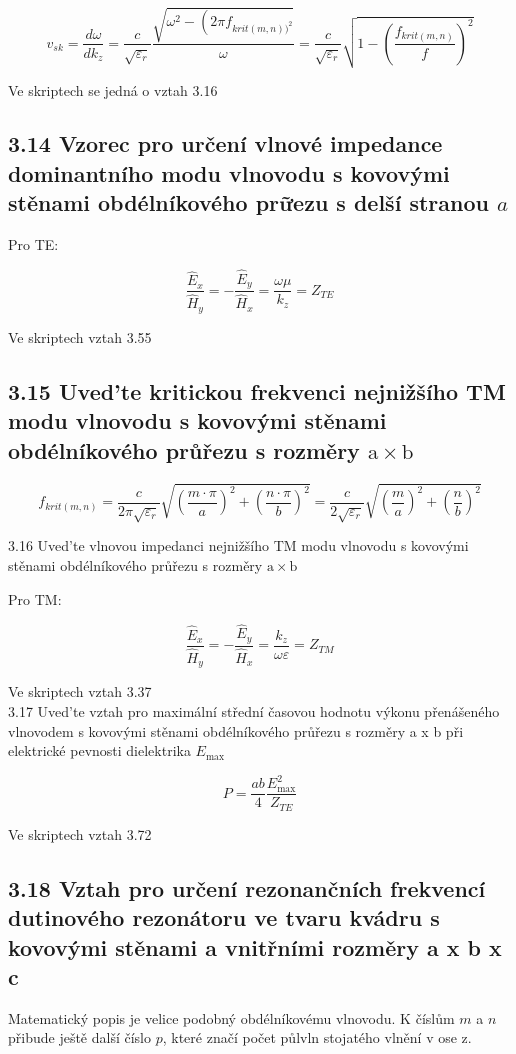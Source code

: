 \documentclass[10pt]{article}
\begin{document}
$$
v_{s k}=\frac{d \omega}{d k_{z}}=\frac{c}{\sqrt{\varepsilon_{r}}} \frac{\sqrt{\omega^{2}-\left(2 \pi f_{k r i t(m, n))^{2}}\right.}}{\omega}=\frac{c}{\sqrt{\varepsilon_{r}}} \sqrt{1-\left(\frac{f_{k r i t(m, n)}}{f}\right)^{2}}
$$

Ve skriptech se jedná o vztah 3.16

\subsection*{3.14 Vzorec pro určení vlnové impedance dominantního modu vlnovodu s kovovými stěnami obdélníkového prữezu s delší stranou $a$}
Pro TE:

$$
\frac{\hat{E}_{x}}{\hat{H}_{y}}=-\frac{\hat{E}_{y}}{\hat{H}_{x}}=\frac{\omega \mu}{k_{z}}=Z_{T E}
$$

Ve skriptech vztah 3.55

\subsection*{3.15 Uved'te kritickou frekvenci nejnižšího TM modu vlnovodu s kovovými stěnami obdélníkového průřezu s rozměry $\mathrm{a} \times \mathrm{b}$}
$$
f_{k r i t(m, n)}=\frac{c}{2 \pi \sqrt{\varepsilon_{r}}} \sqrt{\left(\frac{m \cdot \pi}{a}\right)^{2}+\left(\frac{n \cdot \pi}{b}\right)^{2}}=\frac{c}{2 \sqrt{\varepsilon_{r}}} \sqrt{\left(\frac{m}{a}\right)^{2}+\left(\frac{n}{b}\right)^{2}}
$$

3.16 Uved'te vlnovou impedanci nejnižšího TM modu vlnovodu s kovovými stěnami obdélníkového průřezu s rozměry $\mathrm{a} \times \mathrm{b}$

Pro TM:

$$
\frac{\hat{E}_{x}}{\hat{H}_{y}}=-\frac{\hat{E}_{y}}{\hat{H}_{x}}=\frac{k_{z}}{\omega \varepsilon}=Z_{T M}
$$

Ve skriptech vztah 3.37\\
3.17 Uved'te vztah pro maximální střední časovou hodnotu výkonu přenášeného vlnovodem s kovovými stěnami obdélníkového průřezu s rozměry a x b při elektrické pevnosti dielektrika $E_{\text {max }}$

$$
P=\frac{a b}{4} \frac{E_{\max }^{2}}{Z_{T E}}
$$

Ve skriptech vztah 3.72

\subsection*{3.18 Vztah pro určení rezonančních frekvencí dutinového rezonátoru ve tvaru kvádru s kovovými stěnami a vnitřními rozměry a x b x c}
Matematický popis je velice podobný obdélníkovému vlnovodu. K číslům $m$ a $n$ přibude ještě další číslo $p$, které značí počet půlvln stojatého vlnění v ose z.
\end{document}

